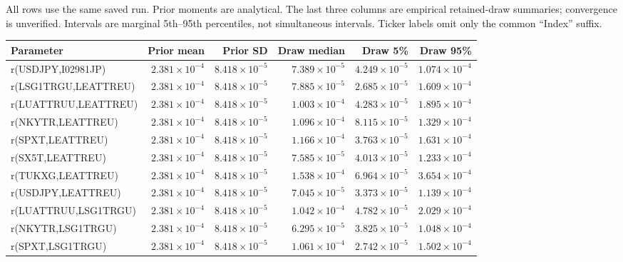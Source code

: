 \documentclass[10pt,a4paper]{article}
\begin{document}
\small All rows use the same saved run. Prior moments are analytical.
The last three columns are empirical retained-draw summaries; convergence is unverified.
Intervals are marginal 5th--95th percentiles, not simultaneous intervals.
Ticker labels omit only the common ``Index'' suffix.
\par\medskip
\begingroup\fontsize{7.8}{10.5}\selectfont\setlength{\tabcolsep}{3pt}
\renewcommand{\arraystretch}{1.45}
\begin{tabular*}{\linewidth}{@{\extracolsep{\fill}}lrrrrr@{}}
\toprule
Parameter & Prior mean & Prior SD & Draw median & Draw 5\% & Draw 95\%\\
\midrule
r(USDJPY,I02981JP) & $2.381\times10^{-4}$ & $8.418\times10^{-5}$ & $7.389\times10^{-5}$ & $4.249\times10^{-5}$ & $1.074\times10^{-4}$ \\
r(LSG1TRGU,LEATTREU) & $2.381\times10^{-4}$ & $8.418\times10^{-5}$ & $7.885\times10^{-5}$ & $2.685\times10^{-5}$ & $1.609\times10^{-4}$ \\
r(LUATTRUU,LEATTREU) & $2.381\times10^{-4}$ & $8.418\times10^{-5}$ & $1.003\times10^{-4}$ & $4.283\times10^{-5}$ & $1.895\times10^{-4}$ \\
r(NKYTR,LEATTREU) & $2.381\times10^{-4}$ & $8.418\times10^{-5}$ & $1.096\times10^{-4}$ & $8.115\times10^{-5}$ & $1.329\times10^{-4}$ \\
r(SPXT,LEATTREU) & $2.381\times10^{-4}$ & $8.418\times10^{-5}$ & $1.166\times10^{-4}$ & $3.763\times10^{-5}$ & $1.631\times10^{-4}$ \\
r(SX5T,LEATTREU) & $2.381\times10^{-4}$ & $8.418\times10^{-5}$ & $7.585\times10^{-5}$ & $4.013\times10^{-5}$ & $1.233\times10^{-4}$ \\
r(TUKXG,LEATTREU) & $2.381\times10^{-4}$ & $8.418\times10^{-5}$ & $1.538\times10^{-4}$ & $6.964\times10^{-5}$ & $3.654\times10^{-4}$ \\
r(USDJPY,LEATTREU) & $2.381\times10^{-4}$ & $8.418\times10^{-5}$ & $7.045\times10^{-5}$ & $3.373\times10^{-5}$ & $1.139\times10^{-4}$ \\
r(LUATTRUU,LSG1TRGU) & $2.381\times10^{-4}$ & $8.418\times10^{-5}$ & $1.042\times10^{-4}$ & $4.782\times10^{-5}$ & $2.029\times10^{-4}$ \\
r(NKYTR,LSG1TRGU) & $2.381\times10^{-4}$ & $8.418\times10^{-5}$ & $6.295\times10^{-5}$ & $3.825\times10^{-5}$ & $1.048\times10^{-4}$ \\
r(SPXT,LSG1TRGU) & $2.381\times10^{-4}$ & $8.418\times10^{-5}$ & $1.061\times10^{-4}$ & $2.742\times10^{-5}$ & $1.502\times10^{-4}$ \\

\end{tabular*}
\end{document}
